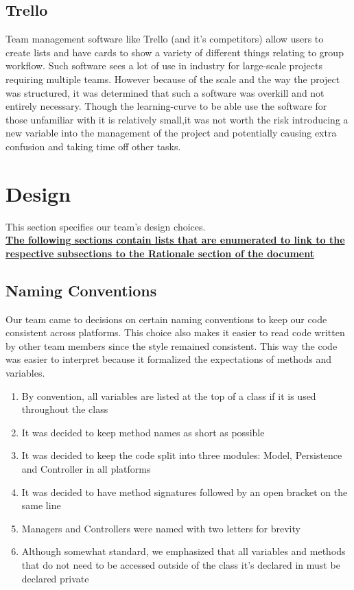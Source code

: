 \documentclass[12pt]{report}
\begin{document}
	\subsection{Trello}
		Team management software like Trello (and it's competitors) allow users to create lists and have cards to show a variety of different things relating to group workflow. Such software sees a lot of use in industry for large-scale projects requiring multiple teams. However because of the scale and the way the project was structured, it was determined that such a software was overkill and not entirely necessary. Though the learning-curve to be able use the software for those unfamiliar with it is relatively small,it was not worth the risk introducing a new variable into the management of the project and potentially causing extra confusion and taking time off other tasks.


\section{Design}
\label{s:integration-design}
This section specifies our team's design choices.\\

\textbf{ \hyperref[s:integration-rationale]{The following sections contain lists that are enumerated to link to the respective subsections to the Rationale section of the document}}

\subsection{Naming Conventions}
Our team came to decisions on certain naming conventions to keep our code consistent across platforms. This choice also makes it easier to read code written by other team members since the style remained consistent. This way the code was easier to interpret because it formalized the expectations of methods and variables. \\


\begin{enumerate}
    \item By convention, all variables are listed at the top of a class if it is used throughout the class
    \item It was decided to keep method names as short as possible
    \item It was decided to keep the code split into three modules: Model, Persistence and Controller in all platforms
    \item It was decided to have method signatures followed by an open bracket on the same line
    \item Managers and Controllers were named with two letters for brevity
    \item Although somewhat standard, we emphasized that all variables and methods that do not need to be accessed outside of the class it's declared in must be declared private
\end{enumerate}
\end{document}
